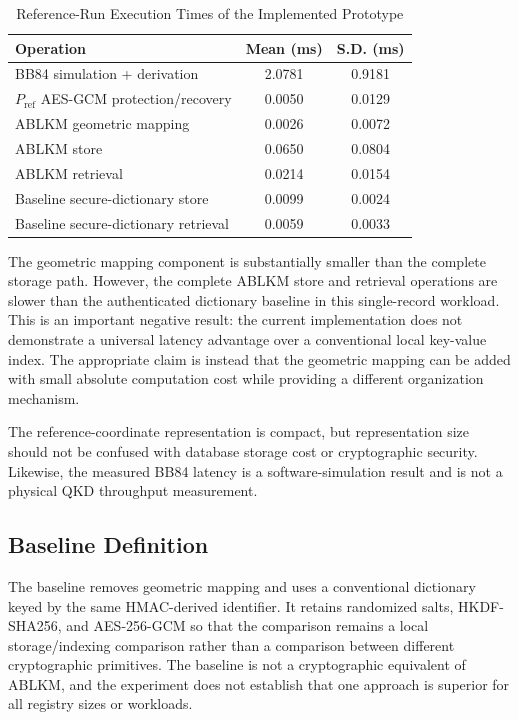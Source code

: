 \documentclass[journal,twocolumn]{IEEEtran}
\begin{document}
\begin{table}[htbp]
\caption{Reference-Run Execution Times of the Implemented Prototype}
\label{tab:execution_times}
\centering
\begin{tabular}{lcc}
\toprule
\textbf{Operation} & \textbf{Mean (ms)} & \textbf{S.D. (ms)} \\
\midrule
BB84 simulation + derivation & 2.0781 & 0.9181 \\
$P_{\mathrm{ref}}$ AES-GCM protection/recovery & 0.0050 & 0.0129 \\
ABLKM geometric mapping & 0.0026 & 0.0072 \\
ABLKM store & 0.0650 & 0.0804 \\
ABLKM retrieval & 0.0214 & 0.0154 \\
Baseline secure-dictionary store & 0.0099 & 0.0024 \\
Baseline secure-dictionary retrieval & 0.0059 & 0.0033 \\
\bottomrule
\end{tabular}
\end{table}

The geometric mapping component is substantially smaller than the complete storage path. However, the complete ABLKM store and retrieval operations are slower than the authenticated dictionary baseline in this single-record workload. This is an important negative result: the current implementation does not demonstrate a universal latency advantage over a conventional local key-value index. The appropriate claim is instead that the geometric mapping can be added with small absolute computation cost while providing a different organization mechanism.

The reference-coordinate representation is compact, but representation size should not be confused with database storage cost or cryptographic security. Likewise, the measured BB84 latency is a software-simulation result and is not a physical QKD throughput measurement.

\subsection{Baseline Definition}

The baseline removes geometric mapping and uses a conventional dictionary keyed by the same HMAC-derived identifier. It retains randomized salts, HKDF-SHA256, and AES-256-GCM so that the comparison remains a local storage/indexing comparison rather than a comparison between different cryptographic primitives. The baseline is not a cryptographic equivalent of ABLKM, and the experiment does not establish that one approach is superior for all registry sizes or workloads.
\end{document}
